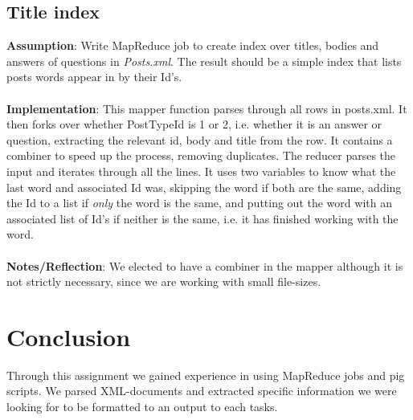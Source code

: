 \documentclass[fleqn,10pt]{wlscirep}
\begin{document}
\subsection{Title index}
\textbf{Assumption}: Write MapReduce job to create index over titles, bodies and answers of questions in \textit{Posts.xml}. The result should be a simple index that lists posts words appear in by their Id's. \\ \\
\textbf{Implementation}: This mapper function parses through all rows in posts.xml. It then forks over whether PostTypeId is 1 or 2, i.e. whether it is an answer or question, extracting the relevant id, body and title from the row. It contains a combiner to speed up the process, removing duplicates. The reducer parses the input and iterates through all the lines. It uses two variables to know what the last word and associated Id was, skipping the word if both are the same, adding the Id to a list if \textit{only} the word is the same, and putting out the word with an associated list of Id's if neither is the same, i.e. it has finished working with the word. \\ \\
\textbf{Notes/Reflection}: We elected to have a combiner in the mapper although it is not strictly necessary, since we are working with small file-sizes.




\section{Conclusion}
Through this assignment we gained experience in using MapReduce jobs and pig scripts. We parsed XML-documents and extracted specific information we were looking for to be formatted to an output to each tasks.



\end{document}
